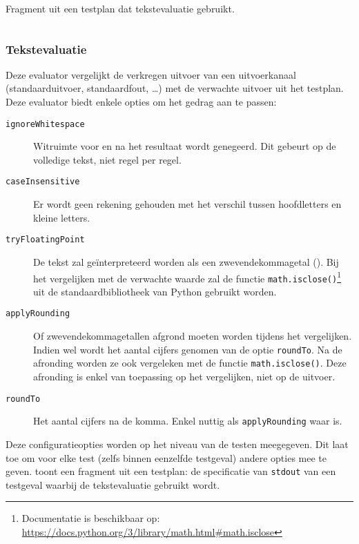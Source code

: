 \begin{listing}
    \caption{Fragment uit een testplan dat tekstevaluatie gebruikt.}
    \label{lst:testplan-text}
    \inputminted[breaklines]{json}{code/testplan-text.json}
\end{listing}

\subsubsection{Tekstevaluatie}

Deze evaluator vergelijkt de verkregen uitvoer van een uitvoerkanaal (standaarduitvoer, standaardfout, \ldots) met de verwachte uitvoer uit het testplan.
Deze evaluator biedt enkele opties om het gedrag aan te passen:

\begin{description}
    \item[\texttt{ignoreWhitespace}]
    Witruimte voor en na het resultaat wordt genegeerd.
    Dit gebeurt op de volledige tekst, niet regel per regel.
    \item[\texttt{caseInsensitive}] Er wordt geen rekening gehouden met het verschil tussen hoofdletters en kleine letters.
    \item[\texttt{tryFloatingPoint}]
    De tekst zal geïnterpreteerd worden als een zwevendekommagetal ().
    Bij het vergelijken met de verwachte waarde zal de functie \texttt{math.isclose()}\footnote{Documentatie is beschikbaar op: \url{https://docs.python.org/3/library/math.html\#math.isclose}} uit de standaardbibliotheek van Python gebruikt worden.
    \item[\texttt{applyRounding}] Of zwevendekommagetallen afgrond moeten worden tijdens het vergelijken.
    Indien wel wordt het aantal cijfers genomen van de optie \texttt{roundTo}.
    Na de afronding worden ze ook vergeleken met de functie \texttt{math.isclose()}.
    Deze afronding is enkel van toepassing op het vergelijken, niet op de uitvoer.
    \item[\texttt{roundTo}] Het aantal cijfers na de komma.
    Enkel nuttig als \texttt{applyRounding} waar is.
\end{description}

Deze configuratieopties worden op het niveau van de testen meegegeven.
Dit laat toe om voor elke test (zelfs binnen eenzelfde testgeval) andere opties mee te geven.
 toont een fragment uit een testplan: de specificatie van \texttt{stdout} van een testgeval waarbij de tekstevaluatie gebruikt wordt.

